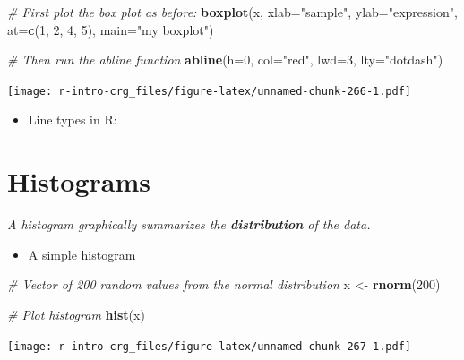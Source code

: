 \documentclass[]{book}
\newenvironment{Shaded}{\begin{snugshade}}{\end{snugshade}}
\newcommand{\CommentTok}[1]{\textcolor[rgb]{0.56,0.35,0.01}{\textit{#1}}}
\newcommand{\DataTypeTok}[1]{\textcolor[rgb]{0.13,0.29,0.53}{#1}}
\newcommand{\DecValTok}[1]{\textcolor[rgb]{0.00,0.00,0.81}{#1}}
\newcommand{\KeywordTok}[1]{\textcolor[rgb]{0.13,0.29,0.53}{\textbf{#1}}}
\newcommand{\NormalTok}[1]{#1}
\newcommand{\StringTok}[1]{\textcolor[rgb]{0.31,0.60,0.02}{#1}}
\providecommand{\tightlist}{%
  \setlength{\itemsep}{0pt}\setlength{\parskip}{0pt}}
\begin{document}
\begin{Shaded}
\begin{Highlighting}[]
\CommentTok{# First plot the box plot as before:}
\KeywordTok{boxplot}\NormalTok{(x, }
    \DataTypeTok{xlab=}\StringTok{"sample"}\NormalTok{,}
    \DataTypeTok{ylab=}\StringTok{"expression"}\NormalTok{,}
    \DataTypeTok{at=}\KeywordTok{c}\NormalTok{(}\DecValTok{1}\NormalTok{, }\DecValTok{2}\NormalTok{, }\DecValTok{4}\NormalTok{, }\DecValTok{5}\NormalTok{),}
     \DataTypeTok{main=}\StringTok{"my boxplot"}\NormalTok{)}
    
\CommentTok{# Then run the abline function}
\KeywordTok{abline}\NormalTok{(}\DataTypeTok{h=}\DecValTok{0}\NormalTok{, }\DataTypeTok{col=}\StringTok{"red"}\NormalTok{, }\DataTypeTok{lwd=}\DecValTok{3}\NormalTok{, }\DataTypeTok{lty=}\StringTok{"dotdash"}\NormalTok{)}
\end{Highlighting}
\end{Shaded}

\texttt{[image: r-intro-crg\_files/figure-latex/unnamed-chunk-266-1.pdf]}

\begin{itemize}
\tightlist
\item
  Line types in R:
\end{itemize}

\hypertarget{histograms}{%
\section{Histograms}\label{histograms}}

\emph{A histogram graphically summarizes the \textbf{distribution} of the data.}

\begin{itemize}
\tightlist
\item
  A simple histogram
\end{itemize}

\begin{Shaded}
\begin{Highlighting}[]
\CommentTok{# Vector of 200 random values from the normal distribution}
\NormalTok{x <-}\StringTok{ }\KeywordTok{rnorm}\NormalTok{(}\DecValTok{200}\NormalTok{)}

\CommentTok{# Plot histogram}
\KeywordTok{hist}\NormalTok{(x)}
\end{Highlighting}
\end{Shaded}

\texttt{[image: r-intro-crg\_files/figure-latex/unnamed-chunk-267-1.pdf]}
\end{document}
